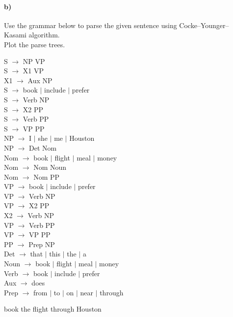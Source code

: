 \documentclass[a4paper,12pt]{article}
\begin{document}
\paragraph{b)} Use the grammar below to parse the given sentence using Cocke–Younger–Kasami algorithm. \\
Plot the parse trees. \\

\begin{multicols}{2}
S $\to$ NP VP \\
S $\to$ X1 VP \\
X1 $\to$ Aux NP \\
S $\to$ book $\mid$ include $\mid$ prefer \\
S $\to$ Verb NP \\
S $\to$ X2 PP \\
S $\to$ Verb PP \\
S $\to$ VP PP \\
NP $\to$ I $\mid$ she $\mid$ me $\mid$ Houston \\
NP $\to$ Det Nom \\
Nom $\to$ book $\mid$ flight $\mid$ meal $\mid$ money \\
Nom $\to$ Nom Noun \\
Nom $\to$ Nom PP \\
VP $\to$ book $\mid$ include $\mid$ prefer \\
VP $\to$ Verb NP \\
VP $\to$ X2 PP \\
X2 $\to$ Verb NP \\
VP $\to$ Verb PP \\
VP $\to$ VP PP \\
PP $\to$ Prep NP \\
Det $\to$ that $\mid$ this $\mid$ the $\mid$ a \\
Noun $\to$ book $\mid$ flight $\mid$ meal $\mid$ money \\
Verb $\to$ book $\mid$ include $\mid$ prefer \\
Aux $\to$ does \\
Prep $\to$ from $\mid$ to $\mid$ on $\mid$ near $\mid$ through \\
\end{multicols}

\vspace{5mm}

book the flight through Houston \\
\end{document}
